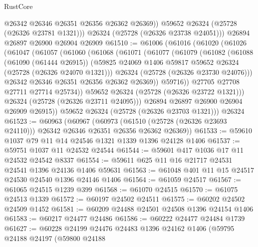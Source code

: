 \begin{lexlean}{RustCore}
\begin{coremodule}
            @26342
            @26346
            @26351
            @26356
            @26362
            @26369))
        @59652
        @26324
        (@25728 (@26326 @23781 @1321)))
      @26324
      (@25728 (@26326 @23738 @24051)))
    @26894
    @26897
    @26900
    @26904
    @26909
@61510 := @61006
    (@61016
      (@61020
        (@61026
          (@61047
            (@61057
              (@61060
                (@61068
                  (@61071
                    (@61077
                      (@61079
                        (@61082
                          (@61088
                            (@61090 (@61444 @26915))
                            (@59825
                              @24069
                              @1406
                              @59817
                              @59652
                              @26324
                              (@25728 (@26326 @24070 @1321)))
                            @26324
                            (@25728 (@26326 @23730 @24076)))
                          @26342
                          @26346
                          @26351
                          @26356
                          @26362
                          @26369))
                      @59716))
                  @27705
                  @27708
                  @27711
                  @27714
                  @25734))
              @59652
              @26324
              (@25728 (@26326 @23722 @1321)))
            @26324
            (@25728 (@26326 @23711 @24095)))
          @26894
          @26897
          @26900
          @26904
          @26909
          @26915))
      @59652
      @26324
      (@25728 (@26326 @23703 @1321)))
    @26324
@61523 := @60963
    (@60967
      (@60973 (@61510 (@25728 (@26326 @23693 @24110))) @26342 @26346 @26351 @26356 @26362 @26369))
@61533 := @59610 @1037 @79 @11 @14 @24546 @1321 @1339 @1396 @24128 @1406
@61537 := @59751 @1037 @11 @24532 @24544
@61544 := @59601 @417 @1036 @17 @11 @24532 @24542 @8337
@61554 := @59611 @625 @11 @16 @21717 @24531 @24541 @1396 @24136 @1406 @59631
@61563 := @61048 @401 @11 @15 @24517 @24530 @24540 @1396 @24146 @1406
@61564 := @61059 @24517
@61567 := @61065 @24515 @1239 @399
@61568 := @61070 @24515
@61570 := @61075 @24513 @1339
@61572 := @60197 @24502 @24511
@61575 := @60202 @24502 @24509 @1452
@61581 := @60209 @24488 @24501 @24508 @1396 @24154 @1406
@61583 := @60217 @24477 @24486
@61586 := @60222 @24477 @24484 @1739
@61627 := @60228
    @24199
    @24476
    @24483
    @1396
    @24162
    @1406
    (@59795
      @24188
      @24197
      (@59800
        @24188

\end{coremodule}
\end{lexlean}
